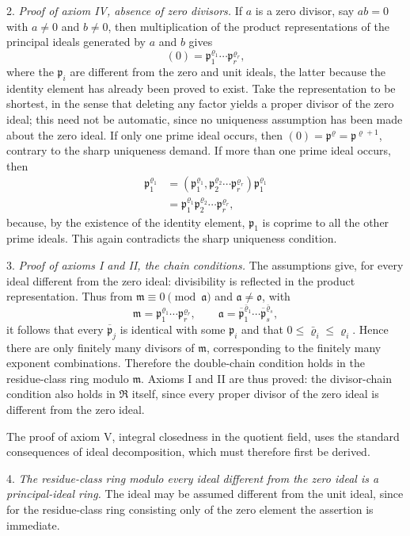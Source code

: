 \documentclass[11pt]{article}
\providecommand{\mR}{\mathfrak{R}}
\providecommand{\ma}{\mathfrak{a}}
\providecommand{\mm}{\mathfrak{m}}
\providecommand{\mo}{\mathfrak{o}}
\providecommand{\mpideal}{\mathfrak{p}}
\providecommand{\mbar}[1]{\overline{#1}}
\begin{document}
2. \emph{Proof of axiom IV, absence of zero divisors.} If $a$ is a zero divisor, say $ab=0$ with $a\ne0$ and $b\ne0$, then multiplication of the product representations of the principal ideals generated by $a$ and $b$ gives
\[
        (0)=\mpideal_1^{\varrho_1}\cdots\mpideal_r^{\varrho_r},
\]
where the $\mpideal_i$ are different from the zero and unit ideals, the latter because the identity element has already been proved to exist. Take the representation to be shortest, in the sense that deleting any factor yields a proper divisor of the zero ideal; this need not be automatic, since no uniqueness assumption has been made about the zero ideal. If only one prime ideal occurs, then $(0)=\mpideal^\varrho=\mpideal^{\varrho+1}$, contrary to the sharp uniqueness demand. If more than one prime ideal occurs, then
\[
\begin{aligned}
\mpideal_1^{\varrho_1}
 &= (\mpideal_1^{\varrho_1},\mpideal_2^{\varrho_2}\cdots\mpideal_r^{\varrho_r})\mpideal_1^{\varrho_1}  \\
 &= \mpideal_1^{\varrho_1}\mpideal_2^{\varrho_2}\cdots\mpideal_r^{\varrho_r},
\end{aligned}
\]
because, by the existence of the identity element, $\mpideal_1$ is coprime to all the other prime ideals. This again contradicts the sharp uniqueness condition.

3. \emph{Proof of axioms I and II, the chain conditions.} The assumptions give, for every ideal different from the zero ideal: divisibility is reflected in the product representation. Thus from $\mm\equiv0\pmod{\ma}$ and $\ma\ne\mo$, with
\[
        \mm=\mpideal_1^{\varrho_1}\cdots\mpideal_r^{\varrho_r},
        \qquad
        \ma=\mbar\mpideal_1^{\bar\varrho_1}\cdots\mbar\mpideal_s^{\bar\varrho_s},
\]
it follows that every $\mbar\mpideal_j$ is identical with some $\mpideal_i$ and that $0\le\bar\varrho_i\le\varrho_i$. Hence there are only finitely many divisors of $\mm$, corresponding to the finitely many exponent combinations. Therefore the double-chain condition holds in the residue-class ring modulo $\mm$. Axioms I and II are thus proved: the divisor-chain condition also holds in $\mR$ itself, since every proper divisor of the zero ideal is different from the zero ideal.

The proof of axiom V, integral closedness in the quotient field, uses the standard consequences of ideal decomposition, which must therefore first be derived.

4. \emph{The residue-class ring modulo every ideal different from the zero ideal is a principal-ideal ring.} The ideal may be assumed different from the unit ideal, since for the residue-class ring consisting only of the zero element the assertion is immediate.
\end{document}

